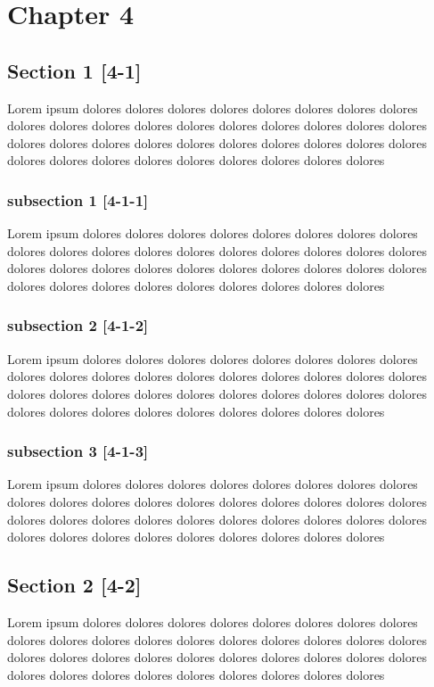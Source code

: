 \chapter{Chapter 4}
\label{chap:3sibling}

\section{Section 1 [4-1]}
\label{sec:31section}

Lorem ipsum dolores dolores dolores dolores dolores dolores dolores dolores dolores dolores dolores dolores dolores dolores dolores dolores dolores dolores dolores dolores dolores dolores dolores dolores dolores dolores dolores dolores dolores dolores dolores dolores dolores dolores dolores dolores dolores 

\subsection{subsection 1 [4-1-1]}
\label{subsec:311subsection}
Lorem ipsum dolores dolores dolores dolores dolores dolores dolores dolores dolores dolores dolores dolores dolores dolores dolores dolores dolores dolores dolores dolores dolores dolores dolores dolores dolores dolores dolores dolores dolores dolores dolores dolores dolores dolores dolores dolores dolores 

\subsection{subsection 2 [4-1-2]}
\label{subsec:312sibling-subsection}
Lorem ipsum dolores dolores dolores dolores dolores dolores dolores dolores dolores dolores dolores dolores dolores dolores dolores dolores dolores dolores dolores dolores dolores dolores dolores dolores dolores dolores dolores dolores dolores dolores dolores dolores dolores dolores dolores dolores dolores 

\subsection{subsection 3 [4-1-3]}
\label{subsec:313sibling-subsection}
Lorem ipsum dolores dolores dolores dolores dolores dolores dolores dolores dolores dolores dolores dolores dolores dolores dolores dolores dolores dolores dolores dolores dolores dolores dolores dolores dolores dolores dolores dolores dolores dolores dolores dolores dolores dolores dolores dolores dolores 

\section{Section 2 [4-2]}
\label{sec:32another}
Lorem ipsum dolores dolores dolores dolores dolores dolores dolores dolores dolores dolores dolores dolores dolores dolores dolores dolores dolores dolores dolores dolores dolores dolores dolores dolores dolores dolores dolores dolores dolores dolores dolores dolores dolores dolores dolores dolores dolores 

